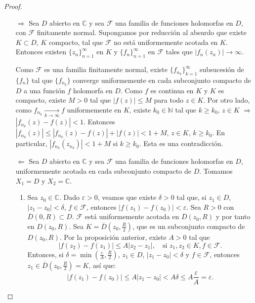 \begin{proof}
    \hfill
    \begin{itemize}
        \item[$\boxed{\Rightarrow}$] Sea $D$ abierto en $\mathbb{C}$ y sea $\mathcal{F}$ una familia de funciones holomorfas en $D$, con $\mathcal{F}$ finitamente normal.
            Supongamos por reducción al absurdo que existe $K \subset D$, $K$ compacto, tal que $\mathcal{F}$ no está uniformemente acotada en $K$.
            Entonces existen $\{z_n\}_{n=1}^\infty$ en $K$ y $\{f_n\}_{n=1}^\infty$ en $\mathcal{F}$ tales que $|f_n(z_n)| \to \infty$.

            Como $\mathcal{F}$ es una familia finitamente normal, existe $\{f_{n_k}\}_{k=1}^\infty$ subsucesión de $\{f_n\}$ tal que $\{f_{n_k}\}$ converge uniformemente en cada subconjunto compacto de $D$ a una función $f$ holomorfa en $D$.
            Como $f$ es continua en $K$ y $K$ es compacto, existe $M > 0$ tal que $|f(z)| \leq M$ para todo $z \in K$.
            Por otro lado, como $f_{n_k} \xrightarrow[k \to \infty]{} f$ uniformemente en $K$, existe $k_0 \in \mathbb{N}$ tal que $k \geq k_0$, $z \in K$ $\Rightarrow$ $|f_{n_k}(z)-f(z)| < 1$.
            Entonces $|f_{n_k}(z)| \leq |f_{n_k}(z)-f(z)| + |f(z)| < 1 + M$, $z \in K$, $k \geq k_0$.
            En particular, $|f_{n_k}(z_{n_k})| < 1 + M$ si $k \geq k_0$.
            Esta es una contradicción.

        \item[$\boxed{\Leftarrow}$] Sea $D$ abierto en $\mathbb{C}$ y sea $\mathcal{F}$ una familia de funciones holomorfas en $D$, uniformemente acotada en cada subconjunto compacto de $D$.
            Tomamos $X_1 = D$ y $X_2 = \mathbb{C}$.

            \begin{enumerate}
                \item Sea $z_0 \in \mathbb{C}$.
                      Dado $\varepsilon > 0$, veamos que existe $\delta > 0$ tal que, si $z_1 \in D$, $|z_1-z_0| < \delta$, $f \in \mathcal{F}$, entonces $|f(z_1) - f(z_0)| < \varepsilon$.
                      Sea $R > 0$ con $\overline{D}(0, R) \subset D$.
                      $\mathcal{F}$ está uniformemente acotada en $\overline{D}(z_0, R)$ y por tanto en $D(z_0, R)$.
                      Sea $K = \overline{D}(z_0, \frac{R}{2})$, que es un subconjunto compacto de $D(z_0, R)$.
                      Por la proposición anterior, existe $A > 0$ tal que
                      $$|f(z_2) - f(z_1)| \leq A|z_2-z_1|, \quad \text{si } z_1, z_2 \in K, f \in \mathcal{F}.$$
                      Entonces, si $\delta = \min \left(\frac{\varepsilon}{A}, \frac{R}{2}\right)$, $z_1 \in D$, $|z_1-z_0| < \delta$ y $f \in \mathcal{F}$, entonces $z_1 \in \overline{D}(z_0, \frac{R}{2}) = K$, así que:
                      $$|f(z_1) - f(z_0)| \leq A|z_1-z_0| < A\delta \leq A\frac{\varepsilon}{A} = \varepsilon.$$


\end{enumerate}
\end{itemize}
\end{proof}

